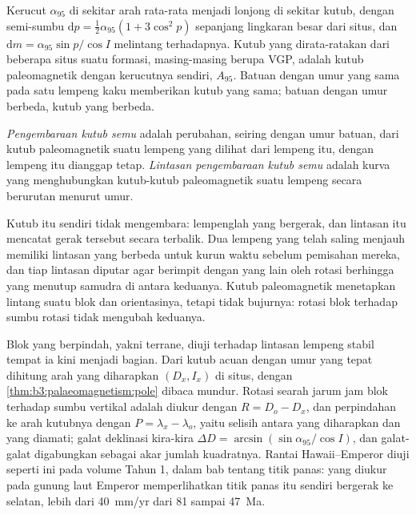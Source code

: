 Kerucut $\alpha_{95}$ di sekitar arah rata-rata menjadi lonjong di sekitar kutub,
dengan semi-sumbu $\mathrm dp = \tfrac12\alpha_{95}(1 + 3\cos^2p)$ sepanjang lingkaran besar
dari situs, dan $\mathrm dm = \alpha_{95}\sin p/\cos I$ melintang terhadapnya. Kutub
yang dirata-ratakan dari beberapa situs suatu formasi, masing-masing berupa VGP, adalah kutub paleomagnetik
dengan kerucutnya sendiri, $A_{95}$. Batuan dengan umur yang sama pada satu lempeng kaku memberikan
kutub yang sama; batuan dengan umur berbeda, kutub yang berbeda.

\begin{definition}\label{def:b3:palaeomagnetism:apw}
\emph{Pengembaraan kutub semu} adalah perubahan, seiring
dengan umur batuan, dari kutub paleomagnetik suatu lempeng yang dilihat dari lempeng itu,
dengan lempeng itu dianggap tetap. \emph{Lintasan pengembaraan kutub semu}
adalah kurva yang menghubungkan kutub-kutub paleomagnetik suatu lempeng secara berurutan
menurut umur.
\end{definition}

Kutub itu sendiri tidak mengembara: lempenglah yang bergerak, dan lintasan itu mencatat
gerak tersebut secara terbalik. Dua lempeng yang telah saling menjauh memiliki lintasan yang berbeda untuk kurun waktu
sebelum pemisahan mereka, dan tiap lintasan diputar agar berimpit dengan yang lain oleh
rotasi berhingga yang menutup samudra di antara keduanya. Kutub paleomagnetik menetapkan
lintang suatu blok dan orientasinya, tetapi tidak bujurnya: rotasi
blok terhadap sumbu rotasi tidak mengubah keduanya.

Blok yang berpindah, yakni terrane, diuji terhadap lintasan lempeng stabil tempat ia
kini menjadi bagian. Dari kutub acuan dengan umur yang tepat dihitung arah yang diharapkan
$(D_x, I_x)$ di situs, dengan \cref{thm:b3:palaeomagnetism:pole}
dibaca mundur. Rotasi searah jarum jam blok terhadap sumbu vertikal adalah
diukur dengan $R = D_o - D_x$, dan perpindahan ke arah kutubnya dengan $P = \lambda_x -
\lambda_o$, yaitu selisih antara  yang diharapkan dan yang diamati; galat
deklinasi kira-kira $\Delta D = \arcsin(\sin\alpha_{95}/\cos I)$,
dan galat-galat digabungkan sebagai akar jumlah kuadratnya. Rantai
Hawaii--Emperor diuji seperti ini pada volume Tahun 1, dalam bab tentang titik panas:
 yang diukur pada gunung laut Emperor memperlihatkan titik panas itu sendiri
bergerak ke selatan, lebih dari \qty{40}{mm/yr} dari 81 sampai \qty{47}{Ma}.

